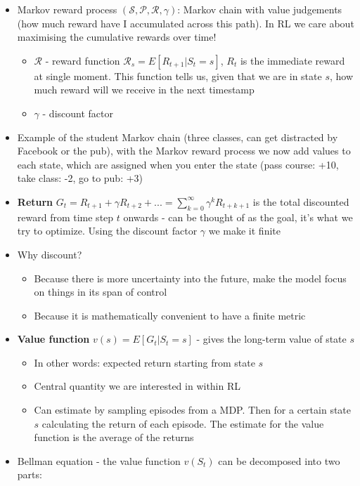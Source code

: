 \documentclass{article}
\begin{document}
\begin{itemize}
    \item Markov reward process $(\mathcal{S}, \mathcal{P}, \mathcal{R}, \gamma)$: Markov chain with value judgements (how much reward have I accumulated across this path). In RL we care about maximising the cumulative rewards over time!
    \begin{itemize}
        \item $\mathcal{R}$ - reward function $\mathcal{R}_s=E[R_{t+1}|S_t=s]$, $R_t$ is the immediate reward at single moment. This function tells us, given that we are in state $s$, how much reward will we receive in the next timestamp
        \item $\gamma$ - discount factor
    \end{itemize}
    \item Example of the student Markov chain (three classes, can get distracted by Facebook or the pub), with the Markov reward process we now add values to each state, which are assigned when you enter the state (pass course: +10, take class: -2, go to pub: +3)
    \item \textbf{Return} $G_t=R_{t+1}+\gamma R_{t+2}+...=\sum^\infty_{k=0}\gamma^k R_{t+k+1}$ is the total discounted reward from time step $t$ onwards - can be thought of as the goal, it's what we try to optimize. Using the discount factor $\gamma$ we make it finite
    \item Why discount?
    \begin{itemize}
        \item Because there is more uncertainty into the future, make the model focus on things in its span of control
        \item Because it is mathematically convenient to have a finite metric
    \end{itemize}
    \item \textbf{Value function} $v(s)=E[G_t|S_t=s]$ - gives the long-term value of state $s$
    \begin{itemize}
        \item In other words: expected return starting from state $s$
        \item Central quantity we are interested in within RL
        \item Can estimate by sampling episodes from a MDP. Then for a certain state $s$ calculating the return of each episode. The estimate for the value function is the average of the returns
    \end{itemize}
    \item Bellman equation - the value function $v(S_t)$ can be decomposed into two parts:

\end{itemize}
\end{document}
